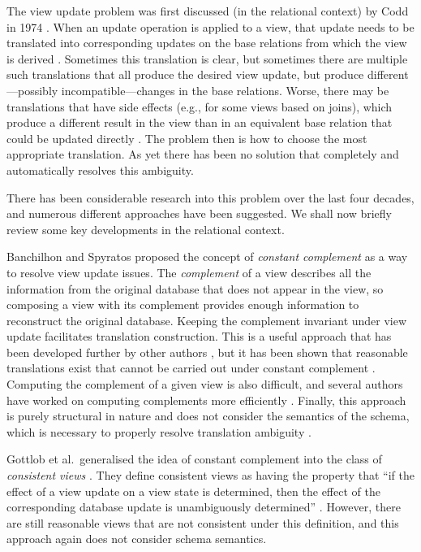 \documentclass{sig-alternate-05-2015}
\begin{document}
\noindent The view update problem was first discussed (in the relational context) by Codd in 1974 \cite{Codd.E-1974a-Recent}. When an update operation is applied to a view, that update needs to be translated into corresponding updates on the base relations from which the view is derived \cite{Keller.A-1985a-Algorithms}. Sometimes this translation is clear, but sometimes there are multiple such translations that all produce the desired view update, but produce different---possibly incompatible---changes in the base relations. Worse, there may be translations that have side effects (e.g., for some views based on joins), which produce a different result in the view than in an equivalent base relation that could be updated directly \cite{Keller.A-1985a-Algorithms}. The problem then is how to choose the most appropriate translation. As yet there has been no solution that completely and automatically resolves this ambiguity.

There has been considerable research into this problem over the last four decades, and numerous different approaches have been suggested. We shall now briefly review some key developments in the relational context.


Banchilhon and Spyratos proposed the concept of \emph{constant complement} \cite{Bancilhon.F-1981a-Update} as a way to resolve view update issues. The \emph{complement} of a view describes all the information from the original database that does not appear in the view, so composing a view with its complement provides enough information to reconstruct the original database. Keeping the complement invariant under view update facilitates translation construction. This is a useful approach that has been developed further by other authors \cite{Hegner.S-2004a-Order-based,Lechtenborger.J-2003a-Impact}, but it has been shown that reasonable translations exist that cannot be carried out under constant complement \cite{Keller.A-1987a-Comment}. Computing the complement of a given view is also difficult, and several authors have worked on computing complements more efficiently \cite{Cosmadakis.S-1984a-Updates,Laurent.D-2001a-Monotonic,Lechtenborger.J-2003a-Computation}. Finally, this approach is purely structural in nature and does not consider the semantics of the schema, which is necessary to properly resolve translation ambiguity \cite{Keller.A-1986a-Role}.

Gottlob et al.\ generalised the idea of constant complement into the class of \emph{consistent views} \cite{Gottlob.G-1988a-Properties}. They define consistent views as having the property that ``if the effect of a view update on a view state is determined, then the effect of the corresponding database update is unambiguously determined'' \cite{Gottlob.G-1988a-Properties}. However, there are still reasonable views that are not consistent under this definition, and this approach again does not consider schema semantics.
\end{document}

